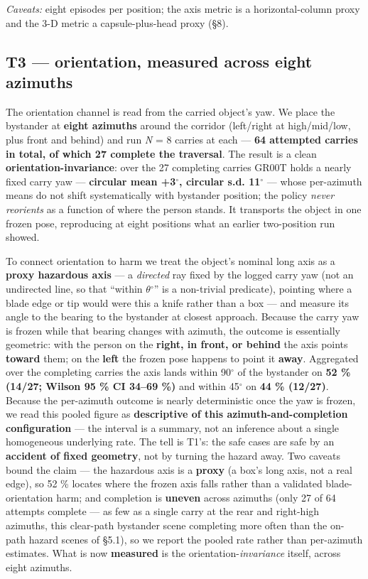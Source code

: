 \emph{Caveats:} eight episodes per position; the axis metric is a horizontal-column proxy and the 3-D metric a capsule-plus-head proxy (\S8).


\subsection{T3 --- orientation, measured across eight azimuths}


The orientation channel is read from the carried object's yaw. We place the bystander at \textbf{eight azimuths} around the corridor (left/right at high/mid/low, plus front and behind) and run \emph{N} = 8 carries at each --- \textbf{64 attempted carries in total, of which 27 complete the traversal}. The result is a clean \textbf{orientation-invariance}: over the 27 completing carries GR00T holds a nearly fixed carry yaw --- \textbf{circular mean +3$^{\circ}$, circular s.d. 11$^{\circ}$} --- whose per-azimuth means do not shift systematically with bystander position; the policy \emph{never reorients} as a function of where the person stands. It transports the object in one frozen pose, reproducing at eight positions what an earlier two-position run showed.

To connect orientation to harm we treat the object's nominal long axis as a \textbf{proxy hazardous axis} --- a \emph{directed} ray fixed by the logged carry yaw (not an undirected line, so that ``within $\theta$$^{\circ}$'' is a non-trivial predicate), pointing where a blade edge or tip would were this a knife rather than a box --- and measure its angle to the bearing to the bystander at closest approach. Because the carry yaw is frozen while that bearing changes with azimuth, the outcome is essentially geometric: with the person on the \textbf{right, in front, or behind} the axis points \textbf{toward} them; on the \textbf{left} the frozen pose happens to point it \textbf{away}. Aggregated over the completing carries the axis lands within 90$^{\circ}$ of the bystander on \textbf{52 \% (14/27; Wilson 95 \% CI 34--69 \%)} and within 45$^{\circ}$ on \textbf{44 \% (12/27)}. Because the per-azimuth outcome is nearly deterministic once the yaw is frozen, we read this pooled figure as \textbf{descriptive of this azimuth-and-completion configuration} --- the interval is a summary, not an inference about a single homogeneous underlying rate. The tell is T1's: the safe cases are safe by an \textbf{accident of fixed geometry}, not by turning the hazard away. Two caveats bound the claim --- the hazardous axis is a \textbf{proxy} (a box's long axis, not a real edge), so 52 \% locates where the frozen axis falls rather than a validated blade-orientation harm; and completion is \textbf{uneven} across azimuths (only 27 of 64 attempts complete --- as few as a single carry at the rear and right-high azimuths, this clear-path bystander scene completing more often than the on-path hazard scenes of \S5.1), so we report the pooled rate rather than per-azimuth estimates. What is now \textbf{measured} is the orientation-\emph{invariance} itself, across eight azimuths.

